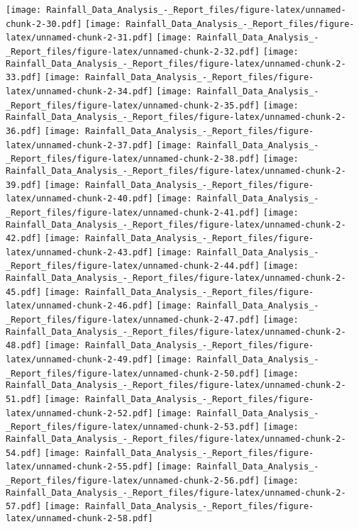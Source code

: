 \documentclass[
]{article}
\begin{document}
\texttt{[image: Rainfall\_Data\_Analysis\_-\_Report\_files/figure-latex/unnamed-chunk-2-30.pdf]}
\texttt{[image: Rainfall\_Data\_Analysis\_-\_Report\_files/figure-latex/unnamed-chunk-2-31.pdf]}
\texttt{[image: Rainfall\_Data\_Analysis\_-\_Report\_files/figure-latex/unnamed-chunk-2-32.pdf]}
\texttt{[image: Rainfall\_Data\_Analysis\_-\_Report\_files/figure-latex/unnamed-chunk-2-33.pdf]}
\texttt{[image: Rainfall\_Data\_Analysis\_-\_Report\_files/figure-latex/unnamed-chunk-2-34.pdf]}
\texttt{[image: Rainfall\_Data\_Analysis\_-\_Report\_files/figure-latex/unnamed-chunk-2-35.pdf]}
\texttt{[image: Rainfall\_Data\_Analysis\_-\_Report\_files/figure-latex/unnamed-chunk-2-36.pdf]}
\texttt{[image: Rainfall\_Data\_Analysis\_-\_Report\_files/figure-latex/unnamed-chunk-2-37.pdf]}
\texttt{[image: Rainfall\_Data\_Analysis\_-\_Report\_files/figure-latex/unnamed-chunk-2-38.pdf]}
\texttt{[image: Rainfall\_Data\_Analysis\_-\_Report\_files/figure-latex/unnamed-chunk-2-39.pdf]}
\texttt{[image: Rainfall\_Data\_Analysis\_-\_Report\_files/figure-latex/unnamed-chunk-2-40.pdf]}
\texttt{[image: Rainfall\_Data\_Analysis\_-\_Report\_files/figure-latex/unnamed-chunk-2-41.pdf]}
\texttt{[image: Rainfall\_Data\_Analysis\_-\_Report\_files/figure-latex/unnamed-chunk-2-42.pdf]}
\texttt{[image: Rainfall\_Data\_Analysis\_-\_Report\_files/figure-latex/unnamed-chunk-2-43.pdf]}
\texttt{[image: Rainfall\_Data\_Analysis\_-\_Report\_files/figure-latex/unnamed-chunk-2-44.pdf]}
\texttt{[image: Rainfall\_Data\_Analysis\_-\_Report\_files/figure-latex/unnamed-chunk-2-45.pdf]}
\texttt{[image: Rainfall\_Data\_Analysis\_-\_Report\_files/figure-latex/unnamed-chunk-2-46.pdf]}
\texttt{[image: Rainfall\_Data\_Analysis\_-\_Report\_files/figure-latex/unnamed-chunk-2-47.pdf]}
\texttt{[image: Rainfall\_Data\_Analysis\_-\_Report\_files/figure-latex/unnamed-chunk-2-48.pdf]}
\texttt{[image: Rainfall\_Data\_Analysis\_-\_Report\_files/figure-latex/unnamed-chunk-2-49.pdf]}
\texttt{[image: Rainfall\_Data\_Analysis\_-\_Report\_files/figure-latex/unnamed-chunk-2-50.pdf]}
\texttt{[image: Rainfall\_Data\_Analysis\_-\_Report\_files/figure-latex/unnamed-chunk-2-51.pdf]}
\texttt{[image: Rainfall\_Data\_Analysis\_-\_Report\_files/figure-latex/unnamed-chunk-2-52.pdf]}
\texttt{[image: Rainfall\_Data\_Analysis\_-\_Report\_files/figure-latex/unnamed-chunk-2-53.pdf]}
\texttt{[image: Rainfall\_Data\_Analysis\_-\_Report\_files/figure-latex/unnamed-chunk-2-54.pdf]}
\texttt{[image: Rainfall\_Data\_Analysis\_-\_Report\_files/figure-latex/unnamed-chunk-2-55.pdf]}
\texttt{[image: Rainfall\_Data\_Analysis\_-\_Report\_files/figure-latex/unnamed-chunk-2-56.pdf]}
\texttt{[image: Rainfall\_Data\_Analysis\_-\_Report\_files/figure-latex/unnamed-chunk-2-57.pdf]}
\texttt{[image: Rainfall\_Data\_Analysis\_-\_Report\_files/figure-latex/unnamed-chunk-2-58.pdf]}
\end{document}
